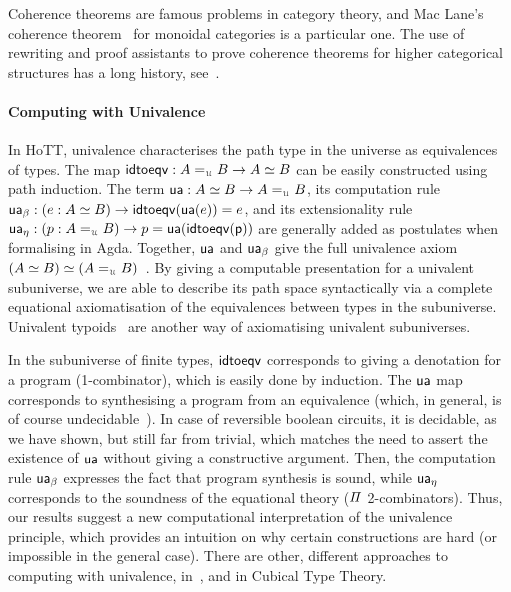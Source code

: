 Coherence theorems are famous problems in category theory, and Mac Lane's coherence
theorem~\cite{maclaneNaturalAssociativityCommutativity1963,joyalBraidedTensorCategories1993,gurskiInfiniteLoopSpaces2013}
for monoidal categories is a particular one. The use of rewriting and proof assistants to prove coherence theorems for
higher categorical structures has a long history,
see~\cite{forestCoherenceGrayCategories2018,beylinExtractingProofCoherence1996}.

\paragraph{Computing with Univalence} In HoTT, univalence characterises the path type in the universe as equivalences of
types. The map $\term{idtoeqv} : A \id_{\UU} B \to A \eqv B$ can be easily constructed using path induction. The term
$\term{ua} : A \eqv B \to A \id_{\UU} B$, its computation rule
$\term{ua_\beta} : (e : A \eqv B) \to \term{idtoeqv}(\term{ua}(e)) \id e$, and its extensionality rule
$\term{ua_\eta} : (p : A \id_{\UU} B) \to p \id \term{ua}(\term{idtoeqv(p)})$ are generally added as postulates when
formalising in Agda. Together, $\operatorname{\mathsf{ua}}$ and $\operatorname{\mathsf{ua}}_\beta$ give the full univalence axiom
$(A \eqv B) \eqv (A \id_{\UU} B)$~\cite[Theorem 3.5]{ortonDecomposingUnivalenceAxiom2018}.
By giving a computable presentation for a univalent subuniverse, we are able to describe its path space syntactically
via a complete equational axiomatisation of the equivalences between types in the subuniverse. Univalent
typoids~\cite{petrakisUnivalentTypoids2019} are another way of axiomatising univalent subuniverses.

In the subuniverse of finite types, $\operatorname{\mathsf{idtoeqv}}$ corresponds to giving a denotation for a program (1-combinator),
which is easily done by induction. The $\operatorname{\mathsf{ua}}$ map corresponds to synthesising a program from an equivalence (which,
in general, is of course undecidable~\cite{krogmeierDecidableSynthesisPrograms2020}). In case of reversible boolean
circuits, it is decidable, as we have shown, but still far from trivial, which matches the need to assert the existence
of $\operatorname{\mathsf{ua}}$ without giving a constructive argument. Then, the computation rule $\operatorname{\mathsf{ua_\beta}}$ expresses the fact
that program synthesis is sound, while $\operatorname{\mathsf{ua_\eta}}$ corresponds to the soundness of the equational theory ($\mathit{\Pi}$
2-combinators). Thus, our results suggest a new computational interpretation of the univalence principle, which provides
an intuition on why certain constructions are hard (or impossible in the general case). There are other, different
approaches to computing with univalence,
in~\cite{angiuliInternalizingRepresentationIndependence2021,tabareauMarriageUnivalenceParametricity2021}, and in Cubical
Type Theory\cite{angiuliComputationalSemanticsCartesianCubical2019,vezzosiCubicalAgdaDependently2019}.

